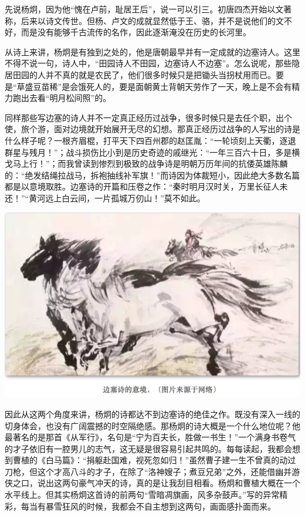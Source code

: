 \documentclass[]{book}
\begin{document}
先说杨炯，因为他``愧在卢前，耻居王后''，说一可以引三。初唐四杰开始以文著称，后来以诗文传世。但杨、卢文的成就显然低于王、骆，并不是说他们的文不好，而是没有能够千古流传的名作，因此逐渐淹没在历史的长河里。

从诗上来讲，杨炯是有独到之处的，他是唐朝最早并有一定成就的边塞诗人。这里不得不说一句，诗人中，``田园诗人不田园，边塞诗人不边塞''。怎么说呢，那些隐居田园的人并不真的就是农民了，他们很多时候只是把锄头当拐杖用而已。要是``草盛豆苗稀''是会饿死人的，要是面朝黄土背朝天劳作了一天，晚上是不会有精力跑出去看``明月松间照''的。

同样那些写边塞的诗人并不一定真正经历过战争，很多时候只是去任个职，出个使，旅个游，面对边境就开始展开无尽的幻想。那真正经历过战争的人写出的诗是什么样子呢？一根齐眉棍，打平天下四百州郡的赵匡胤：``一轮顷刻上天衢，逐退群星与残月！''；战斗损伤比小到是历史奇迹的戚继光：``一年三百六十日，多是横戈马上行！''；而我曾读到惨烈到极致的战争诗是明朝万历年间的抗倭英雄陈麟的：``绝发结绳拉战马，拆袍抽线补军旗！''而诗因为体裁短小，因此绝大多数名篇都是以意境取胜。边塞诗的开篇和压卷之作：``秦时明月汉时关，万里长征人未还！''``黄河远上白云间，一片孤城万仞山！''莫不如此。

\includegraphics[width=8.33in]{images/ctsj1}

因此从这两个角度来讲，杨炯的诗都达不到边塞诗的绝佳之作。既没有深入一线的切身体会，也没有广阔震撼的时空隔绝感。那杨炯的诗大概是一个什么地位呢？他最著名的是那首《从军行》，名句是``宁为百夫长，胜做一书生！''一个满身书卷气的才子依旧有一腔男儿的志气，这无疑是很容易引起共鸣的。每每读起，我都会想到曹植的《白马篇》：``捐躯赴国难，视死忽如归！''虽然曹子建一生不曾真的动过刀枪，但这个才高八斗的才子，在除了``洛神嫂子；煮豆兄弟''之外，还能借幽并游侠之口，说出这两句豪气冲天的诗，真的是让我刮目相看。杨炯和曹植大概在一个水平线上。但其实杨炯这首诗的前两句``雪暗凋旗画，风多杂鼓声。''写的异常精彩，每当有暴雪狂风的时候，我都会不自主想到这两句，画面感扑面而来。
\end{document}
